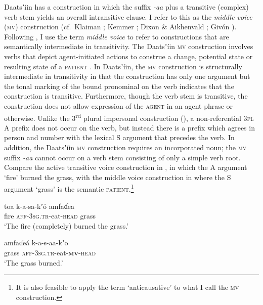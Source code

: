 \documentclass[output=paper]{langsci/langscibook}
\begin{document}
Daatsʼ\'{i}in has a construction in which the suffix \textit{{}-aa }plus a transitive (complex) verb stem yields an overall intransitive clause. I refer to this as the \textit{middle voice} (\textsc{mv}) construction (cf.\ Klaiman \citeyear[44-45]{Klaiman1991}; Kemmer \citeyear[3-4]{Kemmer1993}; Dixon \& Aikhenvald \citeyear[12]{DixonAikhenvald2000}; Giv\'on \citeyear[116-121]{Givon2001}). Following \citet[3]{Kemmer1993}, I use the term \textit{middle voice} to refer to constructions that are semantically intermediate in transitivity. The Daatsʼ\'{i}in\textsc{ mv} construction involves verbs that depict agent-initiated actions to construe a change, potential state or resulting state of a \textsc{patient} \citep[cf.][116]{Givon2001}. In Daatsʼ\'{i}in, the \textsc{mv }construction is structurally intermediate in transitivity in that the construction has only one argument but the tonal marking of the bound pronominal on the verb indicates that the construction is transitive. Furthermore, though the verb stem is transitive, the construction does not allow expression of the \textsc{agent} in an agent phrase or otherwise. Unlike the 3\textsuperscript{rd} plural impersonal construction (), a non-referential 3\textsc{pl} A prefix does not occur on the verb, but instead there is a prefix which agrees in person and number with the lexical S argument that precedes the verb. In addition, the Daatsʼ\'{i}in \textsc{mv} construction requires an incorporated noun; the \textsc{mv} suffix \textit{{}-aa} cannot occur on a verb stem consisting of only a simple verb root. Compare the active transitive voice construction in , in which the A argument ‘fire’ burned the grass, with the middle voice construction in  where the S argument ‘grass’ is the semantic \textsc{patient}.\footnote{It is also feasible to apply the term ‘anticausative’ \citep[cf.][7]{DixonAikhenvald2000} to what I call the \textsc{mv }construction.}  

\ea\label{ex:ahlandc:47}
\gll
toa    k-a-sa-kʼ\'{o}  amfaɗea \\
fire  \textsc{aff-3sg.tr-}eat\textsc{{}-head}  grass \\  
\glt
‘The fire (completely) burned the grass.’  
\z

\ea\label{ex:ahlandc:48}
\gll
amfaɗe\'{a} k-a-s-aa-kʼo \\
grass       \textsc{aff-3sg.tr}{}-eat-\textbf{\textsc{mv}}\textsc{{}-head} \\
\glt
‘The grass burned.’
\z
\end{document}
